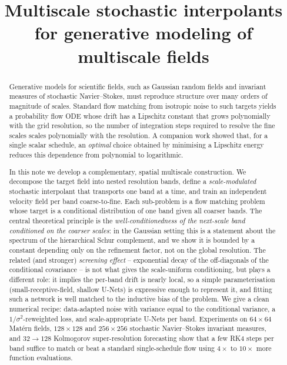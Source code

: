 \documentclass[11pt]{amsart}
\title[Multiscale stochastic interpolants]{Multiscale stochastic interpolants for generative modeling of multiscale fields}
\author{}
\date{}
\theoremstyle{remark}
\numberwithin{equation}{section}
\begin{document}
\begin{abstract}
Generative models for scientific fields, such as Gaussian random fields and invariant measures of stochastic Navier--Stokes, must reproduce structure over many orders of magnitude of scales. Standard flow matching from isotropic noise to such targets yields a probability flow ODE whose drift has a Lipschitz constant that grows polynomially with the grid resolution, so the number of integration steps required to resolve the fine scales scales polynomially with the resolution. A companion work \cite{chen2025scale} showed that, for a single scalar schedule, an \emph{optimal} choice obtained by minimising a Lipschitz energy reduces this dependence from polynomial to logarithmic.

In this note we develop a complementary, spatial multiscale construction. We decompose the target field into nested resolution bands, define a \emph{scale-modulated} stochastic interpolant that transports one band at a time, and train an independent velocity field per band coarse-to-fine. Each sub-problem is a flow matching problem whose target is a conditional distribution of one band given all coarser bands. The central theoretical principle is the \emph{well-conditionedness of the next-scale band conditioned on the coarser scales}: in the Gaussian setting this is a statement about the spectrum of the hierarchical Schur complement, and we show it is bounded by a constant depending only on the refinement factor, not on the global resolution. The related (and stronger) \emph{screening effect} -- exponential decay of the off-diagonals of the conditional covariance -- is not what gives the scale-uniform conditioning, but plays a different role: it implies the per-band drift is nearly local, so a simple parameterisation (small-receptive-field, shallow U-Nets) is expressive enough to represent it, and fitting such a network is well matched to the inductive bias of the problem. We give a clean numerical recipe: data-adapted noise with variance equal to the conditional variance, a $1/\sigma^2$-reweighted loss, and scale-appropriate U-Nets per band. Experiments on $64\times 64$ Mat\'ern fields, $128\times 128$ and $256\times 256$ stochastic Navier--Stokes invariant measures, and $32\!\to\!128$ Kolmogorov super-resolution forecasting show that a few RK4 steps per band suffice to match or beat a standard single-schedule flow using $4\times$ to $10\times$ more function evaluations.
\end{abstract}

\maketitle
\tableofcontents
\end{document}
